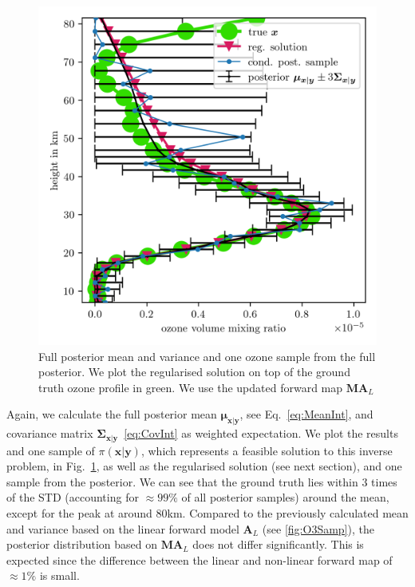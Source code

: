 \begin{figure}[ht!]
	\centering
	\includegraphics{SecRecResinclRegandSampl.png}
	\caption[Full posterior mean and variance of ozone and the regularised solution compared to the ground truth.]{Full  posterior mean and variance and one ozone sample from the full posterior. We plot the regularised solution on top of the ground truth ozone profile in green. We use the updated forward map $\bm{M}\bm{A}_L$}
	\label{fig:O3SolplsReg}
\end{figure} 
Again, we calculate the full posterior mean $\bm{\mu}_{\bm{x}|\bm{y}}$, see Eq.~\ref{eq:MeanInt}, and covariance matrix $\bm{\Sigma}_{ \bm{x}|\bm{y}}$~\ref{eq:CovInt} as weighted expectation.
We plot the results and one sample of $\pi(\bm{x}|\bm{y})$, which represents a feasible solution to this inverse problem, in Fig.~\ref{fig:O3SolplsReg}, as well as the regularised solution (see next section), and one sample from the posterior.
We can see that the ground truth lies within 3 times of the STD (accounting for $\approx 99 \%$ of all posterior samples) around the mean, except for the peak at around $80$km.
Compared to the previously calculated mean and variance based on the linear forward model $\bm{A}_L$ (see \ref{fig:O3Samp}), the posterior distribution based on $\bm{M A}_L$ does not differ significantly.
This is expected since the difference between the linear and non-linear forward map of $\approx 1 \%$ is small.
